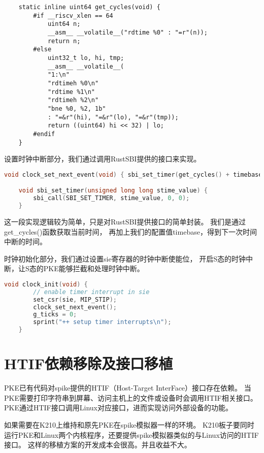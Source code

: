 \begin{lstlisting}
    static inline uint64 get_cycles(void) {
        #if __riscv_xlen == 64
            uint64 n;
            __asm__ __volatile__("rdtime %0" : "=r"(n));
            return n;
        #else
            uint32_t lo, hi, tmp;
            __asm__ __volatile__(
            "1:\n"
            "rdtimeh %0\n"
            "rdtime %1\n"
            "rdtimeh %2\n"
            "bne %0, %2, 1b"
            : "=&r"(hi), "=&r"(lo), "=&r"(tmp));
            return ((uint64) hi << 32) | lo;
        #endif
    }    
\end{lstlisting}

设置时钟中断部分，我们通过调用RustSBI提供的接口来实现。

\begin{lstlisting}[caption={设置时钟中断}, label={lst:set_clock_interrupt}, language=C]
    void clock_set_next_event(void) { sbi_set_timer(get_cycles() + timebase); }

    void sbi_set_timer(unsigned long long stime_value) {
        sbi_call(SBI_SET_TIMER, stime_value, 0, 0);
    }  
\end{lstlisting}

这一段实现逻辑较为简单，只是对RustSBI提供接口的简单封装。
我们是通过get\_cycles()函数获取当前时间，
再加上我们的配置值timebase，得到下一次时间中断的时间。

时钟初始化部分，我们通过设置sie寄存器的时钟中断使能位，
开启S态的时钟中断，让S态的PKE能够拦截和处理时钟中断。

\begin{lstlisting}[caption={时钟初始化}, label={lst:clock_init}, language=C]
    void clock_init(void) {
        // enable timer interrupt in sie
        set_csr(sie, MIP_STIP);
        clock_set_next_event();
        g_ticks = 0;
        sprint("++ setup timer interrupts\n");
    }    
\end{lstlisting}

\section{HTIF依赖移除及接口移植}

PKE已有代码对spike提供的HTIF（Host-Target InterFace）接口存在依赖。
当PKE需要打印字符串到屏幕、访问主机上的文件或设备时会调用HTIF相关接口。
PKE通过HTIF接口调用Linux对应接口，进而实现访问外部设备的功能。

如果需要在K210上维持和原先PKE在spike模拟器一样的环境。
K210板子要同时运行PKE和Linux两个内核程序，还要提供spike模拟器类似的与Linux访问的HTIF接口。
这样的移植方案的开发成本会很高。并且收益不大。

